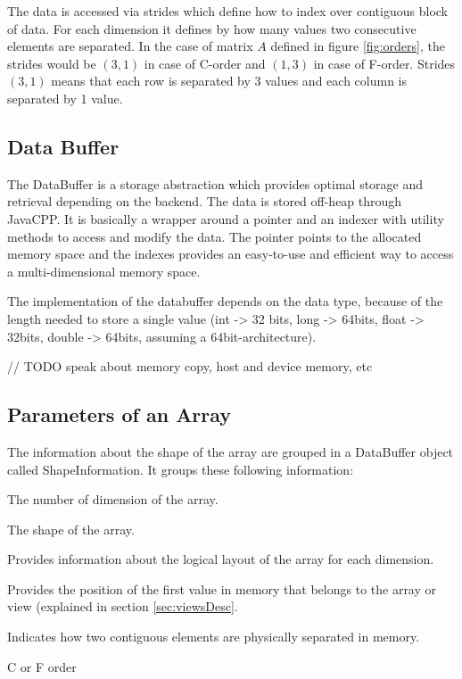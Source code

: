The data is accessed via strides which define how to index over contiguous block of data. For each dimension it defines by how many values two consecutive elements are separated. In the case of matrix $A$ defined in figure \ref{fig:orders}, the strides would be $(3, 1)$ in case of C-order and $(1, 3)$ in case of F-order. Strides $(3, 1)$ means that each row is separated by 3 values and each column is separated by 1 value.

\subsection{Data Buffer}
The DataBuffer is a storage abstraction which provides optimal storage and retrieval depending on the backend. The data is stored off-heap through JavaCPP. It is basically a wrapper around a pointer and an indexer with utility methods to access and modify the data. 
The pointer points to the allocated memory space and the indexes provides an easy-to-use and efficient way to access a multi-dimensional memory space.

The implementation of the databuffer depends on the data type, because of the length needed to store a single value (int -> 32 bits, long -> 64bits, float -> 32bits, double -> 64bits, assuming a 64bit-architecture).

// TODO speak about memory copy, host and device memory, etc
\subsection{Parameters of an Array}
The information about the shape of the array are grouped in a DataBuffer object called ShapeInformation. It groups these following information:

\begin{description}[leftmargin=!,labelwidth=\widthof{\bfseries ElementWiseStride}]
	\item [Rank] The number of dimension of the array.
	\item [Shape] The shape of the array.
	\item [Strides] Provides information about the logical layout of the array for each dimension.
	\item [Offset] Provides the position of the first value in memory that belongs to the array or view (explained in section \ref{sec:viewsDesc}.
	\item [ElementWiseStride] Indicates how two contiguous elements are physically separated in memory.
	\item[Order] C or F order
\end{description}


